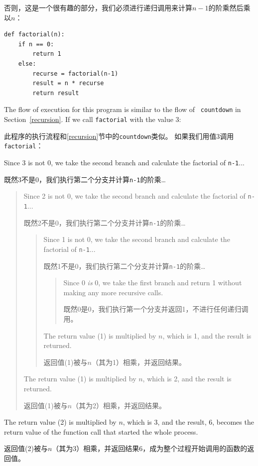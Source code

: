 \documentclass[10pt]{book}
\begin{document}
\begin{CJK}{UTF8}{gbsn}
否则，这是一个很有趣的部分，我们必须进行递归调用来计算$n-1$的阶乘然后乘以$n$：

\begin{verbatim}
def factorial(n):
    if n == 0:
        return 1
    else:
        recurse = factorial(n-1)
        result = n * recurse
        return result
\end{verbatim}
%
The flow of execution for this program is similar to the flow of {\tt
countdown} in Section~\ref{recursion}.  If we call {\tt factorial}
with the value 3:

此程序的执行流程和\ref{recursion}节中的{\tt countdown}类似。
如果我们用值3调用{\tt factorial}：

Since 3 is not 0, we take the second branch and calculate the factorial
of {\tt n-1}...

既然3不是0，我们执行第二个分支并计算{\tt n-1}的阶乘…

\begin{quote}
Since 2 is not 0, we take the second branch and calculate the factorial of
{\tt n-1}...

既然2不是0，我们执行第二个分支并计算{\tt n-1}的阶乘…

  \begin{quote}
  Since 1 is not 0, we take the second branch and calculate the factorial
  of {\tt n-1}...

既然1不是0，我们执行第二个分支并计算{\tt n-1}的阶乘…

    \begin{quote}
    Since 0 {\em is} 0, we take the first branch and return 1
    without making any more recursive calls.
    
    既然0是0，我们执行第一个分支并返回1，不进行任何递归调用。
    \end{quote}


  The return value (1) is multiplied by $n$, which is 1, and the
  result is returned.
  
  返回值(1)被与$n$（其为1）相乘，并返回结果。
  \end{quote}


The return value (1) is multiplied by $n$, which is 2, and the
result is returned.

返回值(1)被与$n$（其为2）相乘，并返回结果。
\end{quote}


The return value (2) is multiplied by $n$, which is 3, and the result, 6,
becomes the return value of the function call that started the whole
process.

返回值(2)被与$n$（其为3）相乘，并返回结果6，成为整个过程开始调用的函数的返回值。


\end{CJK}
\end{document}

